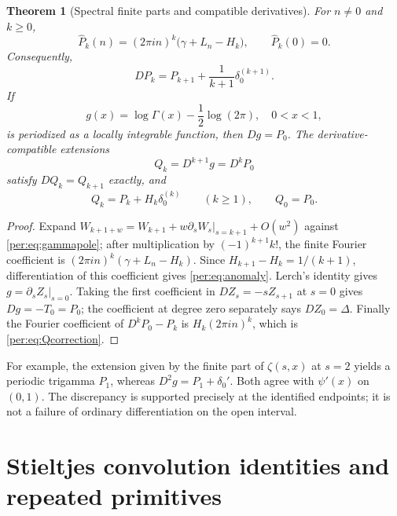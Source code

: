 \documentclass[11pt,letterpaper]{article}
\numberwithin{equation}{section}
\theoremstyle{plain}
\newtheorem{theorem}{Theorem}[section]
\theoremstyle{definition}
\theoremstyle{remark}
\begin{document}
\begin{theorem}[Spectral finite parts and compatible derivatives]
\label{per:thm:contact}
For $n\ne0$ and $k\ge0$,
\begin{equation}\label{per:eq:Pfourier}
 \widehat P_k(n)=(2\pi i n)^k\bigl(\gamma+L_n-H_k\bigr),
 \qquad \widehat P_k(0)=0.
\end{equation}
Consequently,
\begin{equation}\label{per:eq:anomaly}
 DP_k=P_{k+1}+\frac{1}{k+1}\delta_0^{(k+1)}.
\end{equation}
If
\[
 g(x)=\log\Gamma(x)-\frac12\log(2\pi),\quad 0<x<1,
\]
is periodized as a locally integrable function, then $Dg=P_0$. The
derivative-compatible extensions
\begin{equation}\label{per:eq:Q}
 Q_k=D^{k+1}g=D^kP_0
\end{equation}
satisfy $DQ_k=Q_{k+1}$ exactly, and
\begin{equation}\label{per:eq:Qcorrection}
 Q_k=P_k+H_k\delta_0^{(k)}\qquad(k\ge1),\qquad Q_0=P_0.
\end{equation}
\end{theorem}

\begin{proof}
Expand $W_{k+1+w}=W_{k+1}+w\partial_sW_s|_{s=k+1}+O(w^2)$
against \eqref{per:eq:gammapole}; after multiplication by
$(-1)^{k+1}k!$, the finite Fourier coefficient is
$(2\pi i n)^k(\gamma+L_n-H_k)$.
Since $H_{k+1}-H_k=1/(k+1)$, differentiation of this coefficient gives
\eqref{per:eq:anomaly}. Lerch's identity gives $g=\partial_sZ_s|_{s=0}$.
Taking the first coefficient in $DZ_s=-sZ_{s+1}$ at $s=0$ gives
$Dg=-T_0=P_0$; the coefficient at degree zero separately says
$DZ_0=\Delta$. Finally the Fourier coefficient of $D^kP_0-P_k$ is
$H_k(2\pi i n)^k$, which is \eqref{per:eq:Qcorrection}.
\end{proof}

For example, the extension given by the finite part of
$\zeta(s,x)$ at $s=2$ yields a periodic trigamma $P_1$, whereas
$D^2g=P_1+\delta_0'$. Both agree with $\psi'(x)$ on $(0,1)$.
The discrepancy is supported precisely at the identified endpoints;
it is not a failure of ordinary differentiation on the open interval.




\section{Stieltjes convolution identities and repeated primitives}
\label{per:sec:convolutions}
\end{document}
